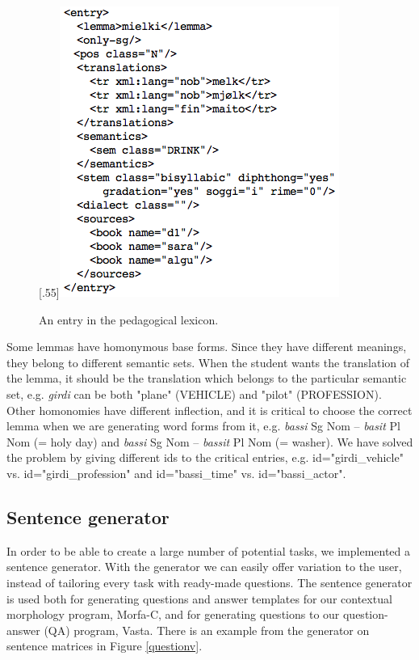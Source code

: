 \documentclass[11pt]{article}
\begin{document}
\begin{figure}[tbp]
\begin{center}
\scalebox{.55}[.55]{\includegraphics{presentation/img/nounlexicon3.png}}\\
\caption{An entry in the pedagogical lexicon.}
\label{nounlex}
\end{center}
\end{figure}

Some lemmas have homonymous base forms. Since they have different meanings, they belong to different semantic sets. When the student wants the translation of the lemma, it should be the translation which belongs to the particular semantic set, e.g. \textit{girdi} can be both "plane" (VEHICLE) and "pilot" (PROFESSION). Other homonomies have different inflection, and it is critical to choose the correct lemma when we are generating word forms from it, e.g. \textit{bassi} Sg Nom -- \textit{basit} Pl Nom (= holy day) and \textit{bassi} Sg Nom -- \textit{bassit} Pl Nom (= washer). We have solved the problem by giving different ids to the critical entries, e.g. id="girdi\_vehicle" vs. 
id="girdi\_profession" and id="bassi\_time" vs. id="bassi\_actor".


\subsection{Sentence generator}\label{set}
In order to be able to create a large number of potential tasks, we implemented a sentence generator. With the generator we can easily offer variation to the user, instead of tailoring every task with ready-made questions. The sentence generator is used both for generating questions and answer templates for our contextual morphology program, Morfa-C, and for generating questions to our question-answer (QA) program, Vasta. There is an example from the generator on sentence matrices in Figure \ref{questionv}.
\end{document}
